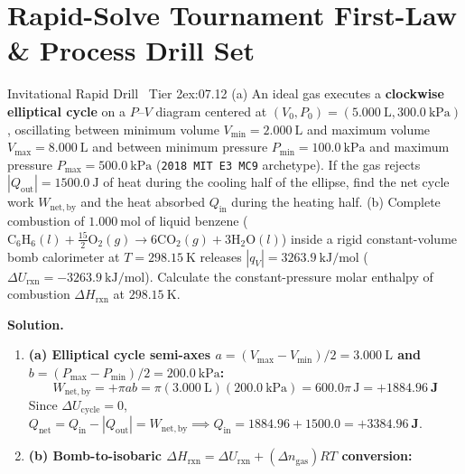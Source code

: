 \section{Rapid-Solve Tournament First-Law \& Process Drill Set}\label{sec:07.9}

\begin{workedexample}{Invitational Rapid Drill \textbar\ Tier 2}{ex:07.12}
(a) An ideal gas executes a \textbf{clockwise elliptical cycle} on a $P$--$V$ diagram centered at $(V_0, P_0) = (\SI{5.000}{\liter}, \SI{300.0}{\kilo\pascal})$, oscillating between minimum volume $V_{\min} = \SI{2.000}{\liter}$ and maximum volume $V_{\max} = \SI{8.000}{\liter}$ and between minimum pressure $P_{\min} = \SI{100.0}{\kilo\pascal}$ and maximum pressure $P_{\max} = \SI{500.0}{\kilo\pascal}$ (\texttt{2018 MIT E3 MC9} archetype). If the gas rejects $|Q_{\mathrm{out}}| = \SI{1500.0}{\joule}$ of heat during the cooling half of the ellipse, find the net cycle work $W_{\mathrm{net,by}}$ and the heat absorbed $Q_{\mathrm{in}}$ during the heating half.
(b) Complete combustion of $\SI{1.000}{\mole}$ of liquid benzene ($\mathrm{C_6H_6}(l) + \frac{15}{2}\mathrm{O_2}(g) \to 6\mathrm{CO_2}(g) + 3\mathrm{H_2O}(l)$) inside a rigid constant-volume bomb calorimeter at $T = \SI{298.15}{\kelvin}$ releases $|q_V| = \SI{3263.9}{\kilo\joule\per\mole}$ ($\Delta U_{\mathrm{rxn}} = \SI{-3263.9}{\kilo\joule\per\mole}$). Calculate the constant-pressure molar enthalpy of combustion $\Delta H_{\mathrm{rxn}}$ at $\SI{298.15}{\kelvin}$.
\par\smallskip\noindent
\textbf{Solution.}
\begin{enumerate}
  \item \textbf{(a) Elliptical cycle semi-axes $a = (V_{\max}-V_{\min})/2 = \SI{3.000}{\liter}$ and $b = (P_{\max}-P_{\min})/2 = \SI{200.0}{\kilo\pascal}$:}
  \[
    W_{\mathrm{net,by}} = +\pi a b = \pi(\SI{3.000}{\liter})(\SI{200.0}{\kilo\pascal}) = 600.0\pi\,\si{\joule} = \mathbf{+\SI{1884.96}{\joule}}
  \]
  Since $\Delta U_{\mathrm{cycle}} = 0$, $Q_{\mathrm{net}} = Q_{\mathrm{in}} - |Q_{\mathrm{out}}| = W_{\mathrm{net,by}} \implies Q_{\mathrm{in}} = 1884.96 + 1500.0 = \mathbf{+\SI{3384.96}{\joule}}$.
  \item \textbf{(b) Bomb-to-isobaric $\Delta H_{\mathrm{rxn}} = \Delta U_{\mathrm{rxn}} + (\Delta n_{\mathrm{gas}})RT$ conversion:}

\end{enumerate}
\end{workedexample}
